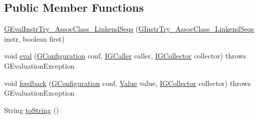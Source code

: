 \subsection*{Public Member Functions}
\begin{DoxyCompactItemize}
\item 
\hyperlink{classorg_1_1tzi_1_1use_1_1gen_1_1assl_1_1dynamics_1_1_g_eval_instr_try___assoc_class___linkend_seqs_a65b11cd22f690da7f0bf0cdc8e0e8ec2}{G\-Eval\-Instr\-Try\-\_\-\-Assoc\-Class\-\_\-\-Linkend\-Seqs} (\hyperlink{classorg_1_1tzi_1_1use_1_1gen_1_1assl_1_1statics_1_1_g_instr_try___assoc_class___linkend_seqs}{G\-Instr\-Try\-\_\-\-Assoc\-Class\-\_\-\-Linkend\-Seqs} instr, boolean first)
\item 
void \hyperlink{classorg_1_1tzi_1_1use_1_1gen_1_1assl_1_1dynamics_1_1_g_eval_instr_try___assoc_class___linkend_seqs_a42e25a81dafc4f78c8102b24dc1a252d}{eval} (\hyperlink{classorg_1_1tzi_1_1use_1_1gen_1_1assl_1_1dynamics_1_1_g_configuration}{G\-Configuration} conf, \hyperlink{interfaceorg_1_1tzi_1_1use_1_1gen_1_1assl_1_1dynamics_1_1_i_g_caller}{I\-G\-Caller} caller, \hyperlink{interfaceorg_1_1tzi_1_1use_1_1gen_1_1assl_1_1dynamics_1_1_i_g_collector}{I\-G\-Collector} collector)  throws G\-Evaluation\-Exception 
\item 
void \hyperlink{classorg_1_1tzi_1_1use_1_1gen_1_1assl_1_1dynamics_1_1_g_eval_instr_try___assoc_class___linkend_seqs_abd4a59108a5b96d01a14b06518efb028}{feedback} (\hyperlink{classorg_1_1tzi_1_1use_1_1gen_1_1assl_1_1dynamics_1_1_g_configuration}{G\-Configuration} conf, \hyperlink{classorg_1_1tzi_1_1use_1_1uml_1_1ocl_1_1value_1_1_value}{Value} value, \hyperlink{interfaceorg_1_1tzi_1_1use_1_1gen_1_1assl_1_1dynamics_1_1_i_g_collector}{I\-G\-Collector} collector)  throws G\-Evaluation\-Exception 
\item 
String \hyperlink{classorg_1_1tzi_1_1use_1_1gen_1_1assl_1_1dynamics_1_1_g_eval_instr_try___assoc_class___linkend_seqs_af0fceac989ec6dee02216a37d80df87e}{to\-String} ()
\end{DoxyCompactItemize}
